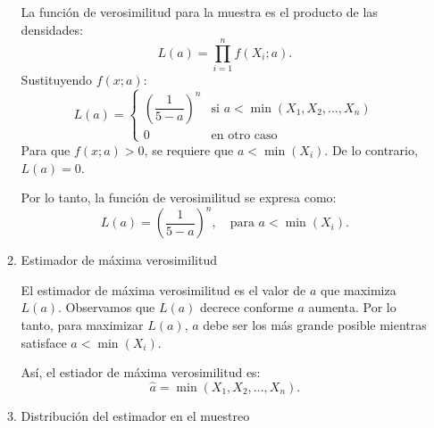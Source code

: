 \begin{enumerate}[label=\color{red}\textbf{\arabic*)}]
\begin{enumerate}[label=\arabic*)]
                La función de verosimilitud para la muestra es el producto de las densidades: \[
                L(a)=\prod_{i=1}^{n} f(X_i;a). 
                \] 
                Sustituyendo $f(x;a)$:  \[
                L(a)=\begin{cases}
                    \left( \dfrac{1}{5-a} \right)^n & \text{si $a<\min(X_1,X_2,\dots,X_n)$}\\
                    0 & \text{en otro caso}
                \end{cases}
                \] 
                Para que $f(x;a)>0$, se requiere que  $a<\min(X_i)$. De lo contrario,  $L(a)=0$.
                
                Por lo tanto, la función de verosimilitud se expresa como:  \[
                L(a)=\left( \dfrac{1}{5-a} \right) ^n,\quad \text{para $a<\min(X_i)$}.
                \] 
            \item Estimador de máxima verosimilitud

                El estimador de máxima verosimilitud es el valor de $a$ que maximiza $L(a)$. Observamos que  $L(a)$ decrece conforme  $a$ aumenta. Por lo tanto, para maximizar $L(a)$,  $a$ debe ser los más grande posible mientras satisface  $a<\min(X_i)$.

                Así, el estiador de máxima verosimilitud es:  \[
                \hat{a}=\min(X_1,X_2,\dots,X_n).
                \] 
            \item Distribución del estimador en el muestreo


\end{enumerate}
\end{enumerate}
